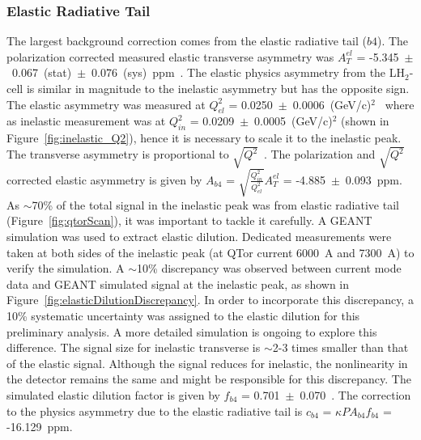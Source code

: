 \subsubsection{Elastic Radiative Tail}
\label{Elastic Radiative Tail}
The largest background correction comes from the elastic radiative tail ($b4$). The polarization corrected measured elastic transverse asymmetry was $A_{T}^{el}$ = -5.345~$\pm$~0.067~(stat)~$\pm$~0.076~(sys)~ppm~\cite{presentation:BPWQweakTransverse_02_21_14}. The elastic physics asymmetry from the LH$_{2}$-cell is similar in magnitude to the inelastic asymmetry but has the opposite sign.
The elastic asymmetry was measured at $Q_{el}^{2}$ = 0.0250~$\pm$~0.0006~(GeV/c)$^{2}$~\cite{PhysRevLett.111.141803} where as inelastic measurement was at $Q_{in}^{2}$ = 0.0209~$\pm$~0.0005~(GeV/c)$^{2}$ (shown in Figure~\ref{fig:inelastic_Q2}), hence it is necessary to scale it to the inelastic peak. The transverse asymmetry is proportional to $\sqrt{Q^{2}}$~\cite{PhysRevC.72.034602, PhysRevC.77.044606}. The polarization and $\sqrt{Q^{2}}$ corrected elastic asymmetry is given by $A_{b4}$ = $\sqrt{\frac{Q_{in}^{2}}{Q_{el}^{2}}}A_{T}^{el}$ = -4.885~$\pm$~0.093~ppm.
As $\sim$70\% of the total signal in the inelastic peak was from elastic radiative tail (Figure~\ref{fig:qtorScan}), it was important to tackle it carefully. 
A GEANT simulation was used to extract elastic dilution. Dedicated measurements were taken at both sides of the inelastic peak (at QTor current 6000~A and 7300~A) to verify the simulation. A $\sim$10\% discrepancy was observed between current mode data and GEANT simulated signal at the inelastic peak, as shown in Figure~\ref{fig:elasticDilutionDiscrepancy}. In order to incorporate this discrepancy, a 10\% systematic uncertainty was assigned to the elastic dilution for this preliminary analysis. A more detailed simulation is ongoing to explore this difference. The signal size for inelastic transverse is $\sim$2-3 times smaller than that of the elastic signal. Although the signal reduces for inelastic, the nonlinearity in the detector remains the same and might be responsible for this discrepancy.
The simulated elastic dilution factor is given by $f_{b4}$ = 0.701~$\pm$~0.070~\cite{elog:adesh_analysis837, elog:nur_ancillary59}. The correction to the physics asymmetry due to the elastic radiative tail is $c_{b4}$ = $\kappa PA_{b4}f_{b4}$ = -16.129~ppm.

